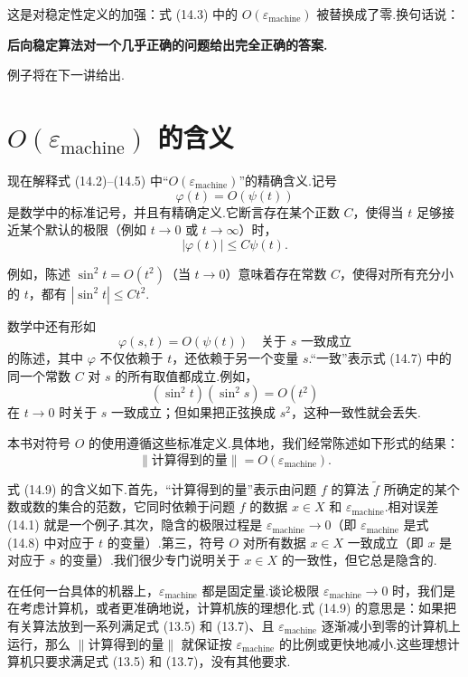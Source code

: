 \documentclass[UTF8,fontset=none,12pt]{ctexart}
\newcommand{\epsmach}{\varepsilon_{\mathrm{machine}}}
\theoremstyle{definition}
\begin{document}
这是对稳定性定义的加强：式 (14.3) 中的 $O(\epsmach)$ 被替换成了零.换句话说：
\begin{center}
\textbf{后向稳定算法对一个几乎正确的问题给出完全正确的答案.}
\end{center}

例子将在下一讲给出.

\section*{$O(\epsmach)$ 的含义}

现在解释式 (14.2)--(14.5) 中“$O(\epsmach)$”的精确含义.记号
\begin{equation}
    \varphi(t)=O(\psi(t))
    \tag{14.6}
\end{equation}
是数学中的标准记号，并且有精确定义.它断言存在某个正数 $C$，使得当 $t$ 足够接近某个默认的极限（例如 $t\to0$ 或 $t\to\infty$）时，
\begin{equation}
    |\varphi(t)|\le C\psi(t).
    \tag{14.7}
\end{equation}

例如，陈述 $\sin^2t=O(t^2)$（当 $t\to0$）意味着存在常数 $C$，使得对所有充分小的 $t$，都有 $|\sin^2t|\le Ct^2$.

数学中还有形如
\begin{equation}
    \varphi(s,t)=O(\psi(t))\quad\text{关于 }s\text{ 一致成立}
    \tag{14.8}
\end{equation}
的陈述，其中 $\varphi$ 不仅依赖于 $t$，还依赖于另一个变量 $s$.“一致”表示式 (14.7) 中的同一个常数 $C$ 对 $s$ 的所有取值都成立.例如，
\[
    (\sin^2t)(\sin^2s)=O(t^2)
\]
在 $t\to0$ 时关于 $s$ 一致成立；但如果把正弦换成 $s^2$，这种一致性就会丢失.

本书对符号 $O$ 的使用遵循这些标准定义.具体地，我们经常陈述如下形式的结果：
\begin{equation}
    \|\text{计算得到的量}\|=O(\epsmach).
    \tag{14.9}
\end{equation}

式 (14.9) 的含义如下.首先，“计算得到的量”表示由问题 $f$ 的算法 $\widetilde f$ 所确定的某个数或数的集合的范数，它同时依赖于问题 $f$ 的数据 $x\in X$ 和 $\epsmach$.相对误差 (14.1) 就是一个例子.其次，隐含的极限过程是 $\epsmach\to0$（即 $\epsmach$ 是式 (14.8) 中对应于 $t$ 的变量）.第三，符号 $O$ 对所有数据 $x\in X$ 一致成立（即 $x$ 是对应于 $s$ 的变量）.我们很少专门说明关于 $x\in X$ 的一致性，但它总是隐含的.

在任何一台具体的机器上，$\epsmach$ 都是固定量.谈论极限 $\epsmach\to0$ 时，我们是在考虑计算机，或者更准确地说，计算机族的理想化.式 (14.9) 的意思是：如果把有关算法放到一系列满足式 (13.5) 和 (13.7)、且 $\epsmach$ 逐渐减小到零的计算机上运行，那么 $\|\text{计算得到的量}\|$ 就保证按 $\epsmach$ 的比例或更快地减小.这些理想计算机只要求满足式 (13.5) 和 (13.7)，没有其他要求.
\end{document}
